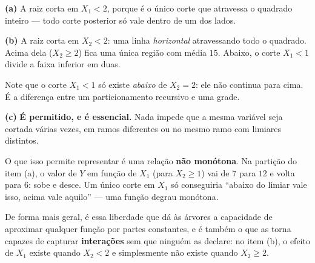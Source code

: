 \documentclass[11pt,a4paper]{article}
\begin{document}
\begin{solucao}
\textbf{(a)} A raiz corta em $X_1<2$, porque é o único corte que atravessa o
quadrado inteiro --- todo corte posterior só vale dentro de um dos lados.
\begin{center}
\end{center}

\smallskip
\textbf{(b)} A raiz corta em $X_2<2$: uma linha \emph{horizontal} atravessando
todo o quadrado. Acima dela ($X_2\ge2$) fica uma única região com média $15$.
Abaixo, o corte $X_1<1$ divide a faixa inferior em duas.
\begin{center}
\end{center}
Note que o corte $X_1<1$ só existe \emph{abaixo} de $X_2=2$: ele não continua
para cima. É a diferença entre um particionamento recursivo e uma grade.

\smallskip
\textbf{(c)} \textbf{É permitido, e é essencial.} Nada impede que a mesma
variável seja cortada várias vezes, em ramos diferentes ou no mesmo ramo com
limiares distintos.

O que isso permite representar é uma relação \textbf{não monótona}. Na partição
do item (a), o valor de $Y$ em função de $X_1$ (para $X_2\ge1$) vai de $7$ para
$12$ e volta para $6$: sobe e desce. Um único corte em $X_1$ só conseguiria
``abaixo do limiar vale isso, acima vale aquilo'' --- uma função degrau monótona.

De forma mais geral, é essa liberdade que dá às árvores a capacidade de aproximar
qualquer função por partes constantes, e é também o que as torna capazes de
capturar \textbf{interações} sem que ninguém as declare: no item (b), o efeito de
$X_1$ existe quando $X_2<2$ e simplesmente não existe quando $X_2\ge2$.
\end{solucao}
\end{document}

